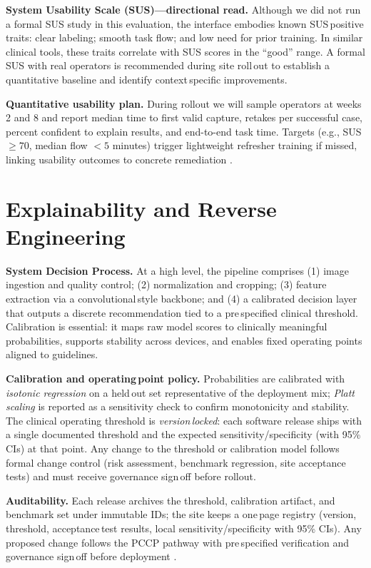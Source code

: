 \documentclass[sigplan,screen]{acmart}
\begin{document}
\textbf{System Usability Scale (SUS)—directional read.} Although we did not run a formal SUS study in this evaluation, the interface embodies known SUS\,positive traits: clear labeling; smooth task flow; and low need for prior training. In similar clinical tools, these traits correlate with SUS scores in the “good” range. A formal SUS with real operators is recommended during site roll\,out to establish a quantitative baseline and identify context\,specific improvements.

\textbf{Quantitative usability plan.} During rollout we will sample operators at weeks 2 and 8 and report median time to first valid capture, retakes per successful case, percent confident to explain results, and end-to-end task time. Targets (e.g., SUS $\ge 70$, median flow $<5$ minutes) trigger lightweight refresher training if missed, linking usability outcomes to concrete remediation \cite{nielsen2020usability}.

\section{Explainability and Reverse Engineering}
\textbf{System Decision Process.} At a high level, the pipeline comprises (1) image ingestion and quality control; (2) normalization and cropping; (3) feature extraction via a convolutional\,style backbone; and (4) a calibrated decision layer that outputs a discrete recommendation tied to a pre\,specified clinical threshold. Calibration is essential: it maps raw model scores to clinically meaningful probabilities, supports stability across devices, and enables fixed operating points aligned to guidelines\cite{fda2018denovo_summary}.

\textbf{Calibration and operating\,point policy.} Probabilities are calibrated with \emph{isotonic regression} on a held\,out set representative of the deployment mix; \emph{Platt scaling} is reported as a sensitivity check to confirm monotonicity and stability. The clinical operating threshold is \emph{version\,locked}: each software release ships with a single documented threshold and the expected sensitivity/specificity (with 95\% CIs) at that point. Any change to the threshold or calibration model follows formal change control (risk assessment, benchmark regression, site acceptance tests) and must receive governance sign\,off before rollout.

\textbf{Auditability.} Each release archives the threshold, calibration artifact, and benchmark set under immutable IDs; the site keeps a one\,page registry (version, threshold, acceptance\,test results, local sensitivity/specificity with 95\% CIs). Any proposed change follows the PCCP pathway with pre\,specified verification and governance sign\,off before deployment \cite{fda2018denovo_summary,fda2025aiml}.
\end{document}
